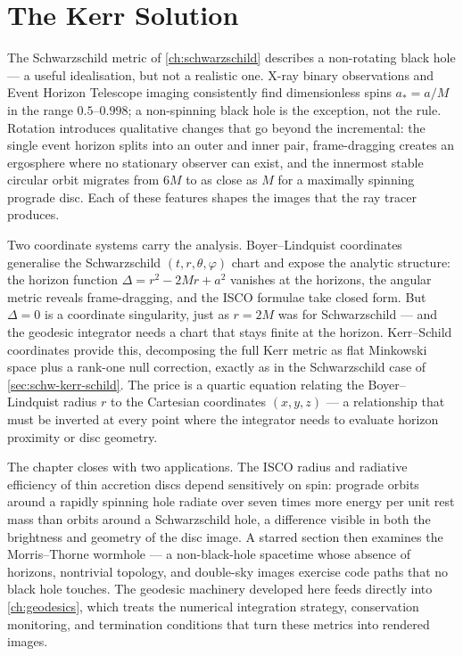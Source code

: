 \chapter{The Kerr Solution}
\label{ch:kerr}

The Schwarzschild metric of \cref{ch:schwarzschild} describes a non-rotating
black hole --- a useful idealisation, but not a realistic one.  X-ray binary
observations and Event Horizon Telescope imaging consistently find
dimensionless spins $a_* = a/M$ in the range $0.5$--$0.998$; a non-spinning
black hole is the exception, not the rule.  Rotation introduces qualitative
changes that go beyond the incremental: the single event horizon splits into
an outer and inner pair, frame-dragging creates an ergosphere where no
stationary observer can exist, and the innermost stable circular orbit
migrates from $6M$ to as close as $M$ for a maximally spinning prograde disc.
Each of these features shapes the images that the ray tracer produces.

Two coordinate systems carry the analysis.  Boyer--Lindquist coordinates
generalise the Schwarzschild $(t, r, \theta, \varphi)$ chart and expose the
analytic structure: the horizon function $\Delta = r^2 - 2Mr + a^2$ vanishes
at the horizons, the angular metric reveals frame-dragging, and the ISCO
formulae take closed form.  But $\Delta = 0$ is a coordinate singularity, just
as $r = 2M$ was for Schwarzschild --- and the geodesic integrator needs a
chart that stays finite at the horizon.  Kerr--Schild coordinates provide
this, decomposing the full Kerr metric as flat Minkowski space plus a
rank-one null correction, exactly as in the Schwarzschild case of
\cref{sec:schw-kerr-schild}.  The price is a quartic equation relating the
Boyer--Lindquist radius $r$ to the Cartesian coordinates $(x, y, z)$ --- a
relationship that must be inverted at every point where the integrator needs
to evaluate horizon proximity or disc geometry.

The chapter closes with two applications.  The ISCO radius and radiative
efficiency of thin accretion discs depend sensitively on spin: prograde
orbits around a rapidly spinning hole radiate over seven times more energy
per unit rest mass than orbits around a Schwarzschild hole, a difference
visible in both the brightness and geometry of the disc image.  A starred
section then examines the Morris--Thorne wormhole --- a non-black-hole
spacetime whose absence of horizons, nontrivial topology, and double-sky
images exercise code paths that no black hole touches.  The geodesic
machinery developed here feeds directly into \cref{ch:geodesics}, which
treats the numerical integration strategy, conservation monitoring, and
termination conditions that turn these metrics into rendered images.

